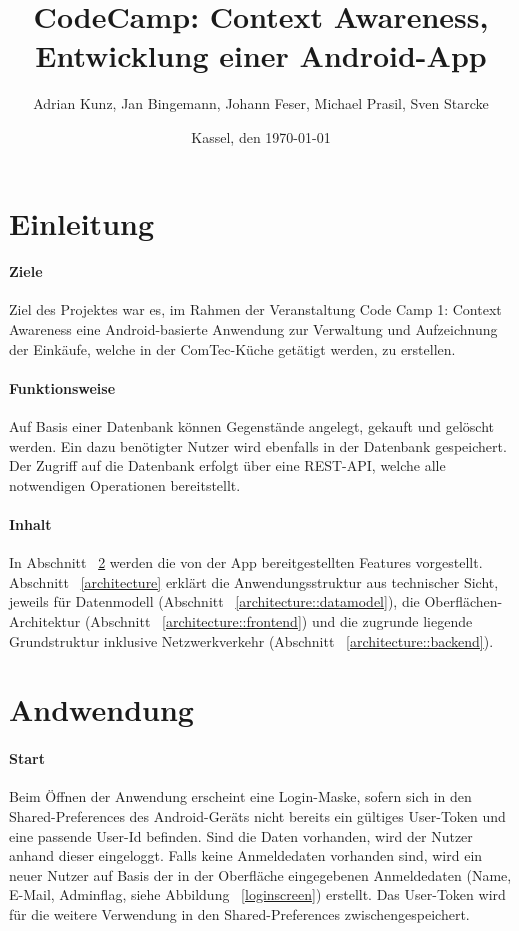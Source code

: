 \documentclass{scrartcl}
\begin{document}
	\title{CodeCamp: Context Awareness, Entwicklung einer Android-App}
	\author{Adrian Kunz, Jan Bingemann, Johann Feser, Michael Prasil, Sven Starcke}
	\date{Kassel, den \today}
	
	\maketitle
	\vspace*{10ex}
	\tableofcontents
	
	\newpage
	
	\section{Einleitung}
		\paragraph*{Ziele}
		Ziel des Projektes war es, im Rahmen der Veranstaltung \glqq Code Camp 1: Context Awareness\grqq{} eine Android-basierte Anwendung zur Verwaltung und Aufzeichnung der Einkäufe, welche in der ComTec-Küche getätigt werden, zu erstellen.
		
		\paragraph*{Funktionsweise}
		Auf Basis einer Datenbank können Gegenstände angelegt, gekauft und gelöscht werden. Ein dazu benötigter Nutzer wird ebenfalls in der Datenbank gespeichert. Der Zugriff auf die Datenbank erfolgt über eine REST-API, welche alle notwendigen Operationen bereitstellt.
		
		\paragraph*{Inhalt}
		In Abschnitt ~\ref{features} werden die von der App bereitgestellten Features vorgestellt. Abschnitt ~\ref{architecture} erklärt die Anwendungsstruktur aus technischer Sicht, jeweils für Datenmodell (Abschnitt ~\ref{architecture::datamodel}), die Oberflächen-Architektur (Abschnitt ~\ref{architecture::frontend}) und die zugrunde liegende Grundstruktur inklusive Netzwerkverkehr (Abschnitt ~\ref{architecture::backend}).
		
	\section{Andwendung} \label{features}
		\paragraph*{Start}
		Beim Öffnen der Anwendung erscheint eine Login-Maske, sofern sich in den Shared-Preferences des Android-Geräts nicht bereits ein gültiges User-Token und eine passende User-Id befinden. Sind die Daten vorhanden, wird der Nutzer anhand dieser eingeloggt. Falls keine Anmeldedaten vorhanden sind, wird ein neuer Nutzer auf Basis der in der Oberfläche eingegebenen Anmeldedaten (Name, E-Mail, Adminflag, siehe Abbildung ~\ref{loginscreen}) erstellt. Das User-Token wird für die weitere Verwendung in den Shared-Preferences zwischengespeichert.
	
\end{document}

